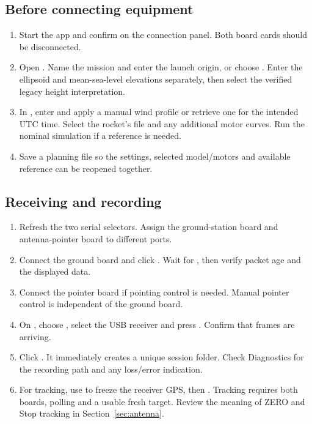 \subsection{Before connecting equipment}
\begin{enumerate}
\item Start the app and confirm  on the connection panel. Both board
cards should be disconnected.
\item Open . Name the mission and enter the
launch origin, or choose . Enter the ellipsoid and mean-sea-level
elevations separately, then select the verified legacy height interpretation.
\item In , enter and apply a manual wind profile or retrieve
one for the intended UTC time. Select the rocket's  file and any
additional motor curves. Run the nominal simulation if a reference is needed.
\item Save a planning  file so the settings, selected model/motors
and available reference can be reopened together.
\end{enumerate}
\subsection{Receiving and recording}
\begin{enumerate}
\item Refresh the two serial selectors. Assign the ground-station board and
antenna-pointer board to different ports.
\item Connect the ground board and click . Wait for
, then verify packet age and the displayed data.
\item Connect the pointer board if pointing control is needed. Manual pointer
control is independent of the ground board.
\item On , choose , select the USB receiver
and press . Confirm that frames are arriving.
\item Click . It immediately creates a unique session folder.
Check Diagnostics for the recording path and any loss/error indication.
\item For tracking, use  to freeze the receiver GPS, then
. Tracking requires both boards, polling and a usable
fresh target. Review the meaning of ZERO and Stop tracking in
Section~\ref{sec:antenna}.
\end{enumerate}
